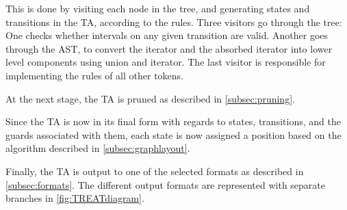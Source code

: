 This is done by visiting each node in the tree, and generating states and transitions in the TA, according to the rules. Three visitors go through the tree: One checks whether intervals on any given transition are valid. Another goes through the AST, to convert the iterator and the absorbed iterator into lower level components using union and iterator. The last visitor is responsible for implementing the rules of all other tokens.

At the next stage, the TA is pruned as described in \cref{subsec:pruning}.

Since the TA is now in its final form with regards to states, transitions, and the guards associated with them, each state is now assigned a position based on the algorithm described in \cref{subsec:graphlayout}.

Finally, the TA is output to one of the selected formats as described in \cref{subsec:formats}. The different output formats are represented with separate branches in \cref{fig:TREATdiagram}.
